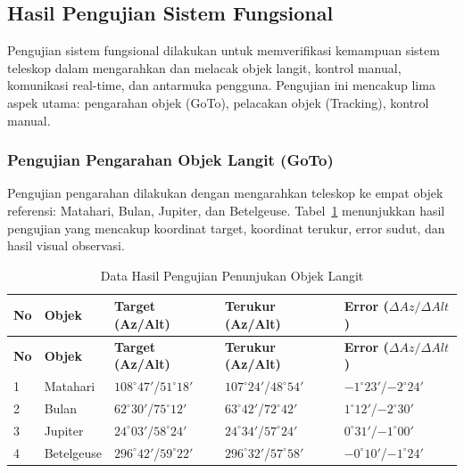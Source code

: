 \subsection{Hasil Pengujian Sistem Fungsional} \label{IV.UjiFungsional}
Pengujian sistem fungsional dilakukan untuk memverifikasi kemampuan sistem teleskop dalam mengarahkan dan melacak objek langit, kontrol manual, komunikasi real-time, dan antarmuka pengguna. Pengujian ini mencakup lima aspek utama: pengarahan objek (GoTo), pelacakan objek (Tracking), kontrol manual. \par

\subsubsection{Pengujian Pengarahan Objek Langit (GoTo)} \label{IV.UjiPointing}
Pengujian pengarahan dilakukan dengan mengarahkan teleskop ke empat objek referensi: Matahari, Bulan, Jupiter, dan Betelgeuse. Tabel~\ref{table:4.pointing_data} menunjukkan hasil pengujian yang mencakup koordinat target, koordinat terukur, error sudut, dan hasil visual observasi.

\begin{longtable}{|p{}|p{}|p{}|p{}|p{}|}
\caption{Data Hasil Pengujian Penunjukan Objek Langit}
\label{table:4.pointing_data} \\
\hline
\textbf{No} & \textbf{Objek} & \textbf{Target (Az/Alt)} & \textbf{Terukur (Az/Alt)} & \textbf{Error ($\Delta Az/ \Delta Alt$)} \\
\hline
\endfirsthead
\hline
\textbf{No} & \textbf{Objek} & \textbf{Target (Az/Alt)} & \textbf{Terukur (Az/Alt)} & \textbf{Error ($\Delta Az/ \Delta Alt$)} \\
\hline
\endhead
\hline
\endfoot
\hline
\endlastfoot

1 & Matahari & $108^\circ47'$/$51^\circ18'$ & $107^\circ24'$/$48^\circ54'$ & $-1^\circ23'$/$-2^\circ24'$ \\ \hline
2 & Bulan & $62^\circ30'$/$75^\circ12'$ & $63^\circ42'$/$72^\circ42'$ & $1^\circ12'$/$-2^\circ30'$ \\ \hline
3 & Jupiter & $24^\circ03'$/$58^\circ24'$ & $24^\circ34'$/$57^\circ24'$ & $0^\circ31'$/$-1^\circ00'$ \\ \hline
4 & Betelgeuse & $296^\circ42'$/$59^\circ22'$ & $296^\circ32'$/$57^\circ58'$ & $-0^\circ10'$/$-1^\circ24'$ \\ \hline

\end{longtable}
